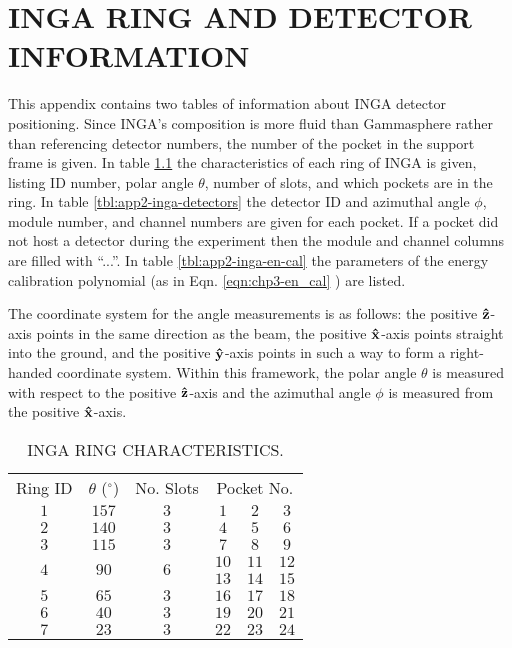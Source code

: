 %
%

\chapter{INGA RING AND DETECTOR INFORMATION}
\label{app:inga-rings-and-detectors}
This appendix contains two tables of information about INGA detector positioning. Since INGA's composition is more fluid than Gammasphere rather than referencing detector numbers, the number of the pocket in the support frame is given. In table \ref{tbl:app2-inga-rings} the characteristics of each ring of INGA is given, listing ID number, polar angle $\theta$, number of slots, and which pockets are in the ring.  In table \ref{tbl:app2-inga-detectors} the detector ID and azimuthal angle $\phi$, module number, and channel numbers are given for each pocket. If a pocket did not host a detector during the experiment then the module and channel columns are filled with ``...''. In table \ref{tbl:app2-inga-en-cal} the parameters of the energy calibration polynomial (as in Eqn. \ref{eqn:chp3-en_cal} ) are listed. 

The coordinate system for the angle measurements is as follows: the positive $\boldsymbol{\hat{\textbf{z}}}$-axis points in the same direction as the beam, the positive $\boldsymbol{\hat{\textbf{x}}}$-axis points straight into the ground, and the positive $\boldsymbol{\hat{\textbf{y}}}$-axis points in such a way to form a right-handed coordinate system. Within this framework, the polar angle $\theta$ is measured with respect to the positive $\boldsymbol{\hat{\textbf{z}}}$-axis and the azimuthal angle $\phi$ is measured from the positive $\boldsymbol{\hat{\textbf{x}}}$-axis.

\begin{table}
\caption{INGA RING CHARACTERISTICS.\label{tbl:app2-inga-rings}}
\begin{center}
\begin{tabular}{|c|c|c|c|c|c|}
\toprule
Ring ID & $\theta$ ($^{\circ}$) & No. Slots&\multicolumn{3}{|c|}{Pocket No.}\\ 
$1$&$157$&$3$&$1$&$2$&$3$\\
$2$&$140$&$3$&$4$&$5$&$6$\\
$3$&$115$&$3$&$7$&$8$&$9$\\
\multirow{2}{*}{$4$}&\multirow{2}{*}{$90$}&\multirow{2}{*}{$6$}&$10$&$11$&$12$\\
&&&$13$&$14$&$15$\\
$5$&$65$&$3$&$16$&$17$&$18$\\
$6$&$40$&$3$&$19$&$20$&$21$\\
$7$&$23$&$3$&$22$&$23$&$24$\\
\bottomrule
\end{tabular}
\end{center}
\end{table}

